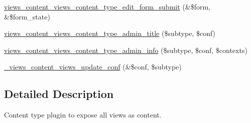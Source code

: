 \begin{DoxyCompactItemize}
\hyperlink{views__content_2plugins_2content__types_2views_8inc_a42df6649c77e401fd112e736dfb7a172}{views\_\-content\_\-views\_\-content\_\-type\_\-edit\_\-form\_\-submit} (\&\$form, \&\$form\_\-state)
\item 
\hyperlink{views__content_2plugins_2content__types_2views_8inc_a33c06994371d4cc130507549e7f546ba}{views\_\-content\_\-views\_\-content\_\-type\_\-admin\_\-title} (\$subtype, \$conf)
\item 
\hyperlink{views__content_2plugins_2content__types_2views_8inc_a91d97e1d609d2c4b68e45802a759d4e1}{views\_\-content\_\-views\_\-content\_\-type\_\-admin\_\-info} (\$subtype, \$conf, \$contexts)
\item 
\hyperlink{views__content_2plugins_2content__types_2views_8inc_a9a08e01f08760b563d3cfc98cc4aa9dc}{\_\-views\_\-content\_\-views\_\-update\_\-conf} (\&\$conf, \$subtype)
\end{DoxyCompactItemize}


\subsection{Detailed Description}
Content type plugin to expose all views as content. 

